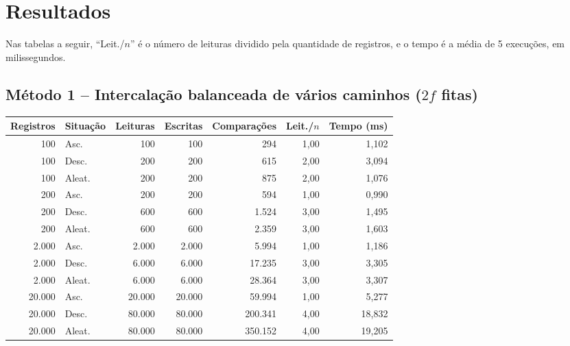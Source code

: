 \documentclass{article}
\begin{document}
\clearpage
\section{Resultados}

Nas tabelas a seguir, ``Leit./$n$'' é o número de leituras dividido pela quantidade de registros, e o tempo é a média de 5 execuções, em milissegundos.

\subsection{Método 1 -- Intercalação balanceada de vários caminhos ($2f$ fitas)}

\begin{table}[!htb]
    \centering
    \small
    \begin{tabular}{|r|l|r|r|r|r|r|}
        \hline\hline
        Registros & Situação & Leituras & Escritas & Comparações & Leit./$n$ & Tempo (ms) \\\hline
        100      & Asc.   &        100 &        100 &         294 &  1,00 &     1,102 \\
        100      & Desc.  &        200 &        200 &         615 &  2,00 &     3,094 \\
        100      & Aleat. &        200 &        200 &         875 &  2,00 &     1,076 \\\hline
        200      & Asc.   &        200 &        200 &         594 &  1,00 &     0,990 \\
        200      & Desc.  &        600 &        600 &       1.524 &  3,00 &     1,495 \\
        200      & Aleat. &        600 &        600 &       2.359 &  3,00 &     1,603 \\\hline
        2.000    & Asc.   &      2.000 &      2.000 &       5.994 &  1,00 &     1,186 \\
        2.000    & Desc.  &      6.000 &      6.000 &      17.235 &  3,00 &     3,305 \\
        2.000    & Aleat. &      6.000 &      6.000 &      28.364 &  3,00 &     3,307 \\\hline
        20.000   & Asc.   &     20.000 &     20.000 &      59.994 &  1,00 &     5,277 \\
        20.000   & Desc.  &     80.000 &     80.000 &     200.341 &  4,00 &    18,832 \\
        20.000   & Aleat. &     80.000 &     80.000 &     350.152 &  4,00 &    19,205 \\\hline

\end{tabular}
\end{table}
\end{document}
